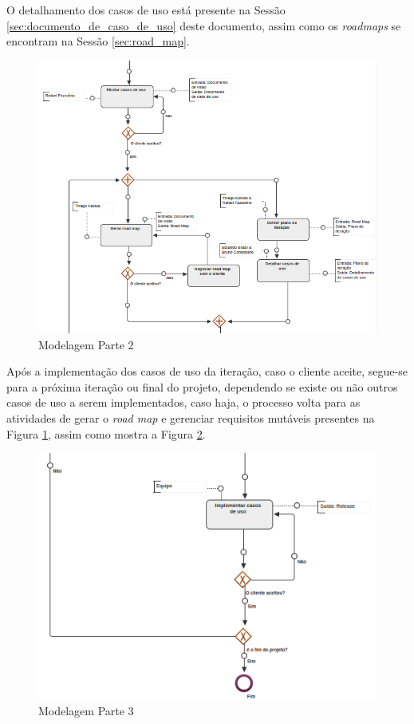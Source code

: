 O detalhamento dos casos de uso está presente na Sessão \ref{sec:documento_de_caso_de_uso} deste documento, assim como os \textit{roadmaps} se encontram na Sessão \ref{sec:road_map}.

\begin{figure}[H]
	\centering
	\includegraphics[width=1\textwidth]{imgModelagem/modelagem2}
	\caption{Modelagem Parte 2}
	\label{img:modelagem2}
\end{figure}

Após a implementação dos casos de uso da iteração, caso o cliente aceite, segue-se para a próxima iteração ou final do projeto, dependendo se existe ou não outros casos de uso a serem implementados, caso haja, o processo volta para as atividades de gerar o \textit{road map}  e gerenciar requisitos mutáveis presentes na Figura \ref{img:modelagem2}, assim como mostra a Figura \ref{img:modelagem3}.

\begin{figure}[H]
	\centering
	\includegraphics[width=1\textwidth]{imgModelagem/modelagem3}
	\caption{Modelagem Parte 3}
	\label{img:modelagem3}
\end{figure}
